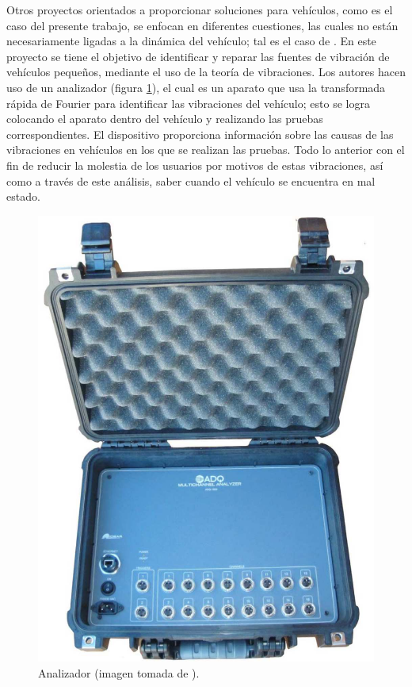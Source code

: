 Otros proyectos orientados a proporcionar soluciones para vehículos, como es el caso del presente trabajo, se enfocan en diferentes cuestiones, las cuales no están necesariamente ligadas a la dinámica del vehículo; tal es el caso de \cite{Quito}.
En este proyecto se tiene el objetivo de identificar y reparar las fuentes de vibración de vehículos pequeños, mediante el uso de la teoría de vibraciones. 
Los autores hacen uso de un analizador (figura \ref{5}), el cual es un aparato que usa la transformada rápida de Fourier para identificar las vibraciones del vehículo; esto se logra colocando el aparato dentro del vehículo y realizando las pruebas correspondientes. 
El dispositivo proporciona información sobre las causas de las vibraciones en vehículos en los que se realizan las pruebas. 
Todo lo anterior con el fin de reducir la molestia de los usuarios por motivos de estas vibraciones, así como a través de este análisis, saber cuando el vehículo se encuentra en mal estado.

\begin{figure}[H]
\centering
\includegraphics[scale=0.4]{5.png}
\caption{Analizador (imagen tomada de \cite{Quito}).}
\label{5}
\end{figure}

